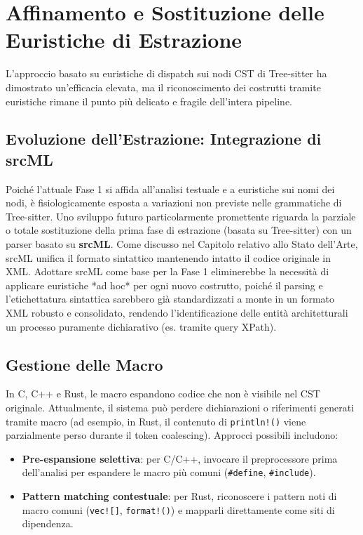 \section{Affinamento e Sostituzione delle Euristiche di Estrazione}
L'approccio basato su euristiche di dispatch sui nodi CST di
Tree-sitter ha dimostrato un'efficacia elevata, ma il riconoscimento
dei costrutti tramite euristiche rimane il punto più delicato e fragile
dell'intera pipeline.

\subsection{Evoluzione dell'Estrazione: Integrazione di srcML}
Poiché l'attuale Fase 1 si affida all'analisi testuale e a euristiche sui
nomi dei nodi, è fisiologicamente esposta a variazioni non previste nelle
grammatiche di Tree-sitter. Uno sviluppo futuro particolarmente promettente
riguarda la parziale o totale sostituzione della prima fase di estrazione
(basata su Tree-sitter) con un parser basato su \textbf{srcML}. 
Come discusso nel Capitolo relativo allo Stato dell'Arte, srcML unifica
il formato sintattico mantenendo intatto il codice originale in XML. 
Adottare srcML come base per la Fase 1 eliminerebbe la necessità di
applicare euristiche *ad hoc* per ogni nuovo costrutto, poiché
il parsing e l'etichettatura sintattica sarebbero già standardizzati 
a monte in un formato XML robusto e consolidato, rendendo l'identificazione 
delle entità architetturali un processo puramente dichiarativo (es. tramite query XPath).

\subsection{Gestione delle Macro}
In C, C++ e Rust, le macro espandono codice che non è visibile nel
CST originale. Attualmente, il sistema può perdere dichiarazioni o
riferimenti generati tramite macro (ad esempio, in Rust, il contenuto
  di \texttt{println!()} viene parzialmente perso durante il token
coalescing). Approcci possibili includono:
\begin{itemize}
  \item \textbf{Pre-espansione selettiva}: per C/C++, invocare il
    preprocessore prima dell'analisi per espandere le macro più
    comuni (\texttt{\#define}, \texttt{\#include}).
  \item \textbf{Pattern matching contestuale}: per Rust, riconoscere
    i pattern noti di macro comuni (\texttt{vec![]},
    \texttt{format!()}) e mapparli direttamente come siti di
    dipendenza.
\end{itemize}

